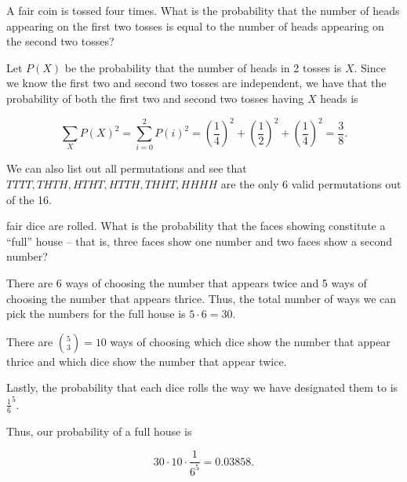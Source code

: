 \documentclass[answers]{exam}
\begin{document}
\begin{questions}

\question[5] A fair coin is tossed four times. What is the probability that the
number of heads appearing on the first two tosses is equal to the number of
heads appearing on the second two tosses?

\begin{solution}
Let $P(X)$ be the probability that the number of heads in 2 tosses is $X$. Since
we know the first two and second two tosses are independent, we have that the
probability of both the first two and second two tosses having $X$ heads is 

\[
\sum_{X}^{} P(X)^2 = \sum_{i=0}^{2} P(i)^2 = \left( \frac{1}{4} \right) ^2 + \left( \frac{1}{2} \right) ^2 + \left( \frac{1}{4} \right) ^2 = \frac{3}{8}
.\] 

We can also list out all permutations and see that $TTTT, THTH, HTHT, HTTH,
THHT, HHHH$ are the only 6 valid permutations out of the 16.
\end{solution}

 fair dice are rolled. What is the probability that the faces
showing constitute a ``full'' house -- that is, three faces show one number and
two faces show a second number?

\begin{solution}
There are 6 ways of choosing the number that appears twice and 5 ways of
choosing the number that appears thrice. Thus, the total number of ways we can
pick the numbers for the full house is $5 \cdot 6 = 30$.

There are $\binom{5}{3} = 10$ ways of choosing which dice show the number that appear
thrice and which dice show the number that appear twice.

Lastly, the probability that each dice rolls the way we have designated them to
is $\frac{1}{6}^{5}$.

Thus, our probability of a full house is

\[
30 \cdot 10 \cdot \frac{1}{6^{5}} = 0.03858
.\] 
\end{solution}


\end{questions}
\end{document}
